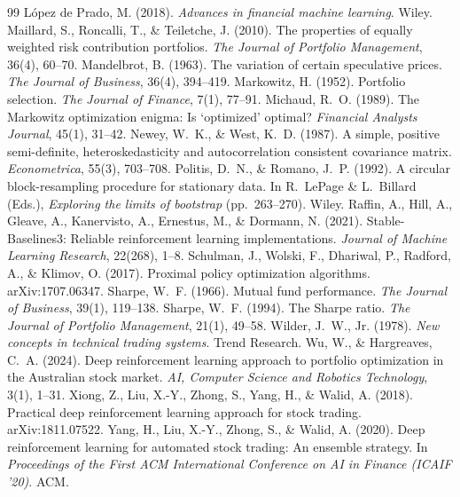 \documentclass[11pt,a4paper]{article}
\begin{document}
\begin{thebibliography}{99}
 López de Prado, M. (2018). \emph{Advances in financial machine learning}. Wiley.
 Maillard, S., Roncalli, T., \& Teiletche, J. (2010). The properties of equally weighted risk contribution portfolios. \emph{The Journal of Portfolio Management}, 36(4), 60--70.
 Mandelbrot, B. (1963). The variation of certain speculative prices. \emph{The Journal of Business}, 36(4), 394--419.
 Markowitz, H. (1952). Portfolio selection. \emph{The Journal of Finance}, 7(1), 77--91.
 Michaud, R.~O. (1989). The Markowitz optimization enigma: Is `optimized' optimal? \emph{Financial Analysts Journal}, 45(1), 31--42.
 Newey, W.~K., \& West, K.~D. (1987). A simple, positive semi-definite, heteroskedasticity and autocorrelation consistent covariance matrix. \emph{Econometrica}, 55(3), 703--708.
 Politis, D.~N., \& Romano, J.~P. (1992). A circular block-resampling procedure for stationary data. In R.~LePage \& L.~Billard (Eds.), \emph{Exploring the limits of bootstrap} (pp.~263--270). Wiley.
 Raffin, A., Hill, A., Gleave, A., Kanervisto, A., Ernestus, M., \& Dormann, N. (2021). Stable-Baselines3: Reliable reinforcement learning implementations. \emph{Journal of Machine Learning Research}, 22(268), 1--8.
 Schulman, J., Wolski, F., Dhariwal, P., Radford, A., \& Klimov, O. (2017). Proximal policy optimization algorithms. arXiv:1707.06347.
 Sharpe, W.~F. (1966). Mutual fund performance. \emph{The Journal of Business}, 39(1), 119--138.
 Sharpe, W.~F. (1994). The Sharpe ratio. \emph{The Journal of Portfolio Management}, 21(1), 49--58.
 Wilder, J.~W., Jr. (1978). \emph{New concepts in technical trading systems}. Trend Research.
 Wu, W., \& Hargreaves, C.~A. (2024). Deep reinforcement learning approach to portfolio optimization in the Australian stock market. \emph{AI, Computer Science and Robotics Technology}, 3(1), 1--31.
 Xiong, Z., Liu, X.-Y., Zhong, S., Yang, H., \& Walid, A. (2018). Practical deep reinforcement learning approach for stock trading. arXiv:1811.07522.
 Yang, H., Liu, X.-Y., Zhong, S., \& Walid, A. (2020). Deep reinforcement learning for automated stock trading: An ensemble strategy. In \emph{Proceedings of the First ACM International Conference on AI in Finance (ICAIF '20)}. ACM.
\end{thebibliography}
\end{document}
